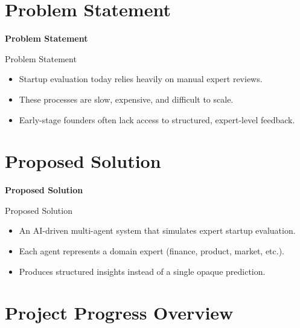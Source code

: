 \documentclass{beamer}
\begin{document}
\section{Problem Statement}

\begin{frame}
\centering
\Huge \textbf{Problem Statement}
\end{frame}

\begin{frame}{Problem Statement}
\begin{itemize}
    \item Startup evaluation today relies heavily on manual expert reviews.
    \item These processes are slow, expensive, and difficult to scale.
    \item Early-stage founders often lack access to structured, expert-level feedback.
\end{itemize}
\end{frame}

\section{Proposed Solution}

\begin{frame}
\centering
\Huge \textbf{Proposed Solution}
\end{frame}

\begin{frame}{Proposed Solution}
\begin{itemize}
    \item An AI-driven multi-agent system that simulates expert startup evaluation.
    \item Each agent represents a domain expert (finance, product, market, etc.).
    \item Produces structured insights instead of a single opaque prediction.
\end{itemize}
\end{frame}

\section{Project Progress Overview}
\end{document}
